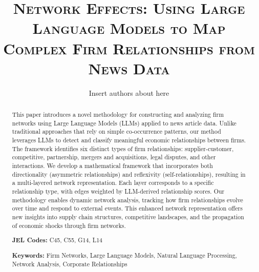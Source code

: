 \documentclass[12pt,a4paper]{article}
\title{\textsc{
{\LARGE Network Effects: Using Large Language Models to Map Complex Firm Relationships from News Data}
}}
\author[1]{
{ \bx \bx \bx Insert authors about here
}

%
}
\date{}  %
\begin{document}
\maketitle
\thispagestyle{empty}  %


\begin{abstract}
%
This paper introduces a novel methodology for constructing and analyzing firm networks using Large Language Models (LLMs) applied to news article data. Unlike traditional approaches that rely on simple co-occurrence patterns, our method leverages LLMs to detect and classify meaningful economic relationships between firms. The framework identifies six distinct types of firm relationships: supplier-customer, competitive, partnership, mergers and acquisitions, legal disputes, and other interactions. We develop a mathematical framework that incorporates both directionality (asymmetric relationships) and reflexivity (self-relationships), resulting in a multi-layered network representation. Each layer corresponds to a specific relationship type, with edges weighted by LLM-derived relationship scores. Our methodology enables dynamic network analysis, tracking how firm relationships evolve over time and respond to external events. This enhanced network representation offers new insights into supply chain structures, competitive landscapes, and the propagation of economic shocks through firm networks.

\bx

\noindent\textbf{JEL Codes:}  C45, C55, G14, L14

\noindent\textbf{Keywords:} Firm Networks, Large Language Models, Natural Language Processing, Network Analysis, Corporate Relationships
\end{abstract}


\newpage
\tableofcontents
\thispagestyle{empty}  %

\newpage
\setcounter{page}{1}
%
%
%
\end{document}
